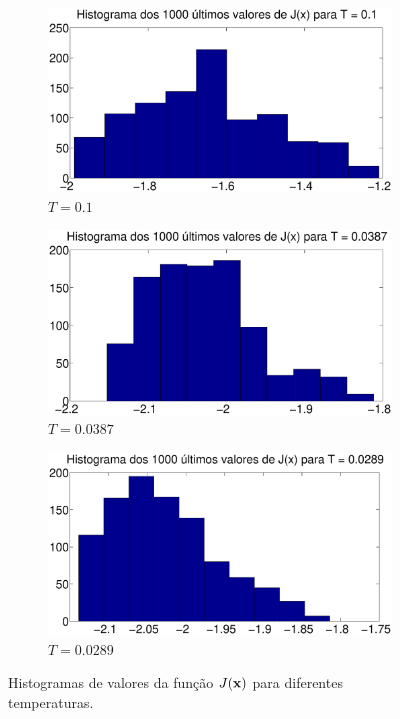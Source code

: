 \documentclass{report}
\begin{document}
\begin{figure}[H]
	\centering
	\begin{subfigure}{0.3\textwidth}
		\centering
		\includegraphics[width = \textwidth]{Q3_histograma_J_t_1_v2}
		\caption{$T = 0.1$}
	\end{subfigure}
	\begin{subfigure}{0.3\textwidth}
		\centering
		\includegraphics[width = \textwidth]{Q3_histograma_J_t_5_v2}
		\caption{$T = 0.0387$}
	\end{subfigure}
	\begin{subfigure}{0.3\textwidth}
		\centering
		\includegraphics[width = \textwidth]{Q3_histograma_J_t_10_v2}
		\caption{$T = 0.0289$}
	\end{subfigure}
	\caption{Histogramas de valores da função $J(\text{\textbf{x}})$ para diferentes temperaturas.}
	\label{histogramas_custos_temperaturas_v2}
\end{figure}
\end{document}

